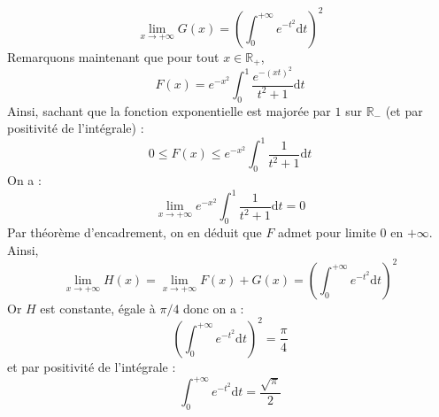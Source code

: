 \documentclass[a4paper,twoside,french,11pt]{VcCours}
\newcommand{\dt}{\text{d}t}
\begin{document}
\begin{enumerate}
$$ \lim_{x \rightarrow + \infty} G(x) = \left( \int_{0}^{+ \infty} e^{-t^2} \dt \right)^2$$
Remarquons maintenant que pour tout $x \in \mathbb{R}_+$,
$$ F(x) = e^{-x^2} \int_{0}^1 \frac{e^{-(xt)^2}}{t^2+1} \dt $$
Ainsi, sachant que la fonction exponentielle est majorée par $1$ sur $\mathbb{R}_{-}$ (et par positivité de l'intégrale) :
$$ 0 \leq F(x)   \leq e^{-x^2} \int_{0}^1 \frac{1}{t^2+1} \dt $$
On a :
$$ \lim_{x \rightarrow + \infty} e^{-x^2} \int_{0}^1 \frac{1}{t^2+1} \dt = 0$$
Par théorème d'encadrement, on en déduit que $F$ admet pour limite $0$ en $+ \infty$. Ainsi,
$$ \lim_{x \rightarrow + \infty} H(x) = \lim_{x \rightarrow + \infty} F(x) + G(x) =  \left( \int_{0}^{+ \infty} e^{-t^2} \dt \right)^2$$
Or $H$ est constante, égale à $\pi/4$ donc on a :
$$ \left( \int_{0}^{+ \infty} e^{-t^2} \dt \right)^2 = \dfrac{\pi}{4}$$
et par positivité de l'intégrale :
$$  \int_{0}^{+ \infty} e^{-t^2} \dt  = \dfrac{\sqrt{\pi}}{2}$$
\end{enumerate}




%
%
%
\end{document}
